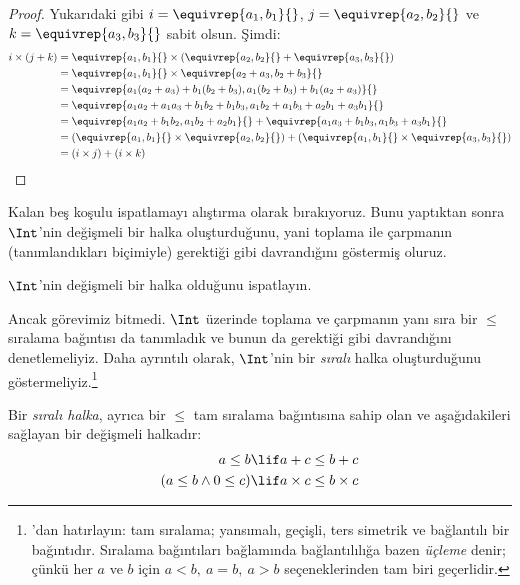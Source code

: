 \begin{proof}
Yukarıdaki gibi $i = \equivrep{a_1, b_1}{}$,
$j = \equivrep{a_2,b_2}{}$ ve $k = \equivrep{a_3, b_3}{}$ sabit olsun.
Şimdi:
\begin{align*}
	i \times (j + k)
	&= \equivrep{a_1, b_1}{} \times (\equivrep{a_2,b_2}{} + \equivrep{a_3, b_3}{})\\
	&= \equivrep{a_1, b_1}{} \times \equivrep{a_2 + a_3,b_2+b_3}{}\\
	&= \equivrep{a_1  (a_2 + a_3) + b_1  (b_2+b_3), a_1  (b_2 + b_3) + b_1 (a_2 + a_3)}{}\\
	&= \equivrep{a_1 a_2 + a_1a_3 + b_1 b_2+b_1b_3, a_1 b_2 + a_1b_3 + a_2b_1 + a_3b_1}{}\\		
	&= \equivrep{a_1a_2 + b_1b_2, a_1b_2 + a_2b_1}{} + \equivrep{a_1a_3 + b_1b_3, a_1b_3 + a_3b_1}{}\\
	&= (\equivrep{a_1, b_1}{} \times \equivrep{a_2,b_2}{}) + (\equivrep{a_1, b_1}{} \times  \equivrep{a_3, b_3}{})\\
	&= (i \times j) + (i \times k)
\end{align*}
\end{proof}

Kalan beş koşulu ispatlamayı alıştırma olarak bırakıyoruz. Bunu yaptıktan
sonra $\Int$'nin değişmeli bir halka oluşturduğunu, yani toplama ile
çarpmanın (tanımlandıkları biçimiyle) gerektiği gibi davrandığını göstermiş
oluruz.

\begin{prob}
$\Int$'nin değişmeli bir halka olduğunu ispatlayın.
\end{prob}

Ancak görevimiz bitmedi. $\Int$ üzerinde toplama ve çarpmanın yanı sıra bir
$\leq$ sıralama bağıntısı da tanımladık ve bunun da gerektiği gibi davrandığını
denetlemeliyiz. Daha ayrıntılı olarak, $\Int$'nin bir \emph{sıralı} halka
oluşturduğunu göstermeliyiz.\footnote{'dan
hatırlayın: tam sıralama; yansımalı, geçişli, ters simetrik ve bağlantılı bir
bağıntıdır. Sıralama bağıntıları bağlamında bağlantılılığa bazen
\emph{üçleme} denir; çünkü her $a$ ve $b$ için
$a < b,\ a = b,\ a > b$ seçeneklerinden tam biri geçerlidir.}

\begin{defn}
Bir \emph{sıralı halka}, ayrıca bir $\leq$ tam sıralama bağıntısına sahip olan
ve aşağıdakileri sağlayan bir değişmeli halkadır:
\begin{align*}
	a \leq b &\lif a + c \leq b + c\\
	(a \leq b \land 0 \leq c) &\lif a \times c \leq b \times c
\end{align*}
\end{defn}


